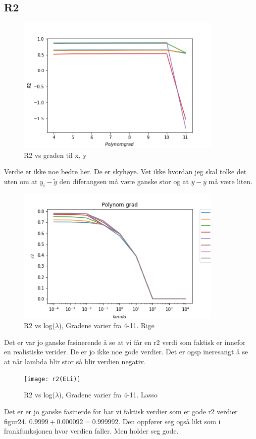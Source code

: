 \documentclass[norsk,a4paper,12pt]{article}
\begin{document}
\subsection*{R2}

\begin{figure}[H]
\includegraphics[width=100mm]{R2E_OLS}
\caption{R2 vs graden til x, y }
\end{figure}
Verdie er ikke noe bedre her. De er skyhøye. Vet ikke hvordan jeg skal tolke det uten om at $y_{i} - \widetilde{ y}$ den diferangsen må være ganske stor og at $y -\bar{y}$ må være liten.

\begin{figure}[H]
\includegraphics[width=100mm]{r2(ERi)}
\caption{R2 vs log($\lambda$), Gradene varier fra 4-11. Rige }
\end{figure}
Det er var jo ganske fasinerende å se at vi får en r2 verdi som faktisk er innefor en realistiske verider. De er jo ikke noe gode verdier. Det er ogsp ineresangt å se at når lambda blir stor så blir verdien  negativ.
\begin{figure}[H]
\texttt{[image: r2(ELi)]}
\caption{R2 vs log($\lambda$), Gradene varier fra 4-11. Lasso }
\end{figure}
Det er er jo ganske fasinerde for har vi faktisk verdier som er gode r2 verdier figur24. $0.9999 + 0.000092=0.999992$. Den oppfører seg også likt som i frankfunksjonen  hvor verdien faller. Men holder seg gode.
\end{document}
